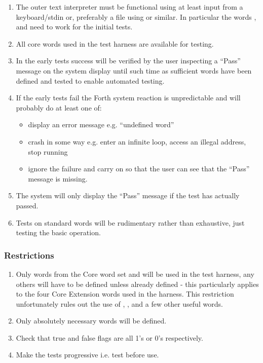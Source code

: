 \renewcommand{\labelenumi}{\arabic{enumi})}
\begin{enumerate}
\item The outer text interpreter must be functional using at least
	 input from a keyboard/stdin or, preferably a file using
	  or similar.
	 In particular the words ,  and
	  need to work for the initial tests. 

\item All core words used in the test harness are available for testing.

\item In the early tests success will be verified by the user inspecting
	a ``Pass'' message on the  system display until such time as
	sufficient words have been defined and tested to enable
	automated testing.

\item If the early tests fail the Forth system reaction is unpredictable
	and will probably do at least one of:
	\begin{itemize}
	\item display an error message e.g. ``undefined word''
	\item crash in some way e.g. enter an infinite loop, access an
		illegal address, stop running
	\item ignore the failure and carry on so that the user can see that
		the ``Pass'' message is missing.
	\end{itemize}

\item The system will only display the ``Pass'' message if the test
	has actually passed.

\item Tests on standard words will be rudimentary rather than
	exhaustive, just testing the basic operation.
\end{enumerate}

\subsubsection{Restrictions}

\begin{enumerate}
\item Only words from the Core word set and will be used in the
	test harness, any others will have to be defined unless already
	defined - this particularly applies to the four Core Extension
	words used in the harness. This restriction unfortunately
	rules out the use of , ,  and
	a few other useful words.

\item Only absolutely necessary words will be defined.

\item Check that true and false flags are all 1's or 0's respectively.

\item Make the tests progressive i.e. test before use.
\end{enumerate}


